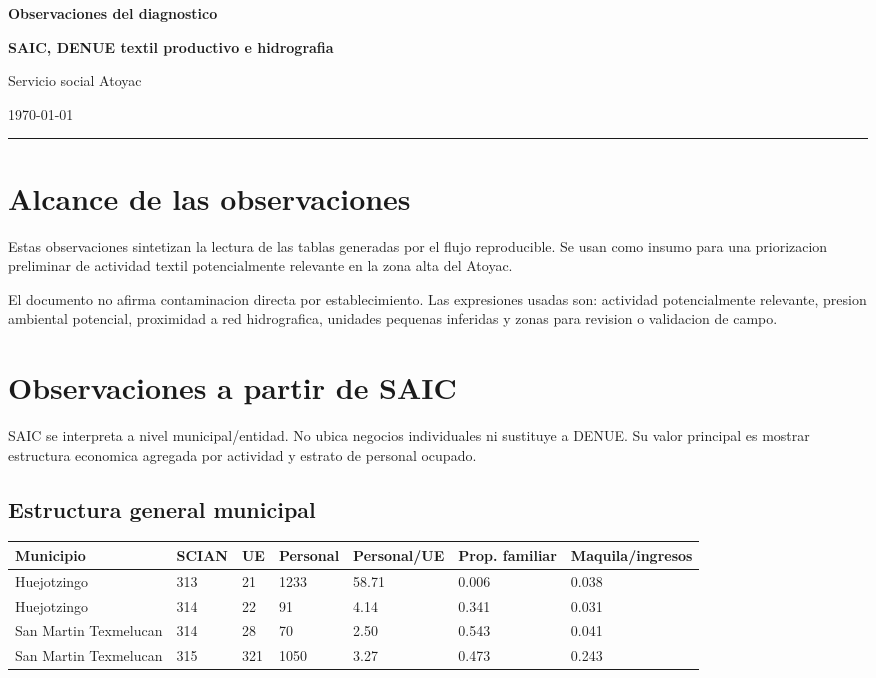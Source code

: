\documentclass[11pt,letterpaper]{article}
\begin{document}
{\centering
{\Huge\bfseries\color{AtoyacBlue} Observaciones del diagnostico\par}
{\Large\bfseries SAIC, DENUE textil productivo e hidrografia\par}
\vspace{0.8em}
{\large Servicio social Atoyac\par}
{\normalsize \today\par}
\vspace{1.2em}
}
\hrule
\vspace{1em}

\section{Alcance de las observaciones}

Estas observaciones sintetizan la lectura de las tablas generadas por el flujo reproducible. Se usan como insumo para una priorizacion preliminar de actividad textil potencialmente relevante en la zona alta del Atoyac.

El documento no afirma contaminacion directa por establecimiento. Las expresiones usadas son: actividad potencialmente relevante, presion ambiental potencial, proximidad a red hidrografica, unidades pequenas inferidas y zonas para revision o validacion de campo.

\section{Observaciones a partir de SAIC}

SAIC se interpreta a nivel municipal/entidad. No ubica negocios individuales ni sustituye a DENUE. Su valor principal es mostrar estructura economica agregada por actividad y estrato de personal ocupado.

\subsection{Estructura general municipal}

\begin{longtable}{p{3.3cm}p{1.7cm}p{1.5cm}p{1.7cm}p{2.2cm}p{2.2cm}p{2.2cm}}
\toprule
Municipio & SCIAN & UE & Personal & Personal/UE & Prop. familiar & Maquila/ingresos \\
\midrule
Huejotzingo & 313 & 21 & 1233 & 58.71 & 0.006 & 0.038 \\
Huejotzingo & 314 & 22 & 91 & 4.14 & 0.341 & 0.031 \\
San Martin Texmelucan & 314 & 28 & 70 & 2.50 & 0.543 & 0.041 \\
San Martin Texmelucan & 315 & 321 & 1050 & 3.27 & 0.473 & 0.243 \\
\bottomrule
\end{longtable}
\end{document}
